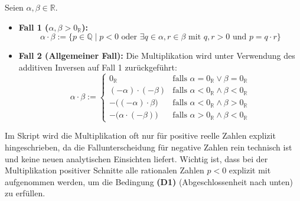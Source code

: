 \begin{math-stroke}
\begin{definition}[Multiplikation]\label{def:multiplikation-reell}
Seien $\alpha, \beta \in \mathbb{R}$.
\begin{itemize}
    \item \textbf{Fall 1 ($\alpha, \beta > 0_{\mathbb{R}}$):}
    \[ \alpha \cdot \beta := \{ p \in \mathbb{Q} \mid p < 0 \text{ oder } \exists q \in \alpha, r \in \beta \text{ mit } q, r > 0 \text{ und } p = q \cdot r \} \]
    \item \textbf{Fall 2 (Allgemeiner Fall):} Die Multiplikation wird unter Verwendung des additiven Inversen auf Fall 1 zurückgeführt:
    \[ \alpha \cdot \beta := \begin{cases} 
    0_{\mathbb{R}} & \text{falls } \alpha = 0_{\mathbb{R}} \lor \beta = 0_{\mathbb{R}} \\
    (-\alpha) \cdot (-\beta) & \text{falls } \alpha < 0_{\mathbb{R}} \land \beta < 0_{\mathbb{R}} \\
    -\bigl((-\alpha) \cdot \beta\bigr) & \text{falls } \alpha < 0_{\mathbb{R}} \land \beta > 0_{\mathbb{R}} \\
    -\bigl(\alpha \cdot (-\beta)\bigr) & \text{falls } \alpha > 0_{\mathbb{R}} \land \beta < 0_{\mathbb{R}}
    \end{cases} \]
\end{itemize}
\end{definition}

\begin{explanation-of-steps}
Im Skript wird die Multiplikation oft nur für positive reelle Zahlen explizit hingeschrieben, da die Fallunterscheidung für negative Zahlen rein technisch ist und keine neuen analytischen Einsichten liefert. Wichtig ist, dass bei der Multiplikation positiver Schnitte alle rationalen Zahlen $p < 0$ explizit mit aufgenommen werden, um die Bedingung \textbf{(D1)} (Abgeschlossenheit nach unten) zu erfüllen. 
\end{explanation-of-steps}
\end{math-stroke}

